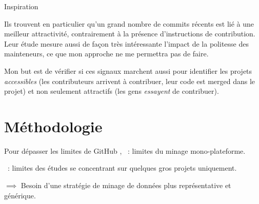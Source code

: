 \documentclass[usenames,dvipsnames,10pt]{beamer}
\newcommand{\mycite}[1]{%
    \citeauthor{#1} \citeyear{#1} \cite{#1}%
}
\begin{document}
\begin{frame}[fragile]{Inspiration}
{        Ils trouvent en particulier qu'un grand nombre de commits récents est
        lié à une meilleur attractivité, contrairement à la présence
        d'instructions de contribution. Leur étude mesure aussi de façon très
        intéressante l'impact de la politesse des mainteneurs, ce que mon
        approche ne me permettra pas de faire.

        Mon but est de vérifier si ces signaux marchent aussi pour identifier
        les projets \emph{accessibles} (les contributeurs arrivent à contribuer,
        leur code est merged dans le projet) et non seulement attractifs (les
        gens \emph{essayent} de contribuer).
    }
\end{frame}

\section{Méthodologie}

\begin{frame}[fragile]{Pour dépasser les limites de GitHub}
    \mycite{mining-github-2014}, \mycite{penumbra-oss-2022} : limites du minage
    mono-plateforme.

    \mycite{barriers-2018} : limites des études se concentrant sur quelques gros
    projets uniquement.

    \bigskip

    $\implies$ Besoin d'une stratégie de minage de données plus représentative
    et générique.

    \begin{figure}
        
    \end{figure}

\end{frame}
\end{document}
